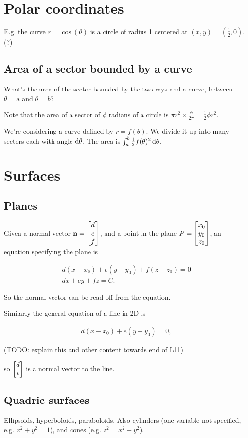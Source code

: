 \documentclass[12pt]{article}
\begin{document}
\section*{Polar coordinates}

E.g. the curve $r = \cos(\theta)$ is a circle of radius 1 centered at $(x, y) = (\frac{1}{2}, 0)$. (?)

\subsection*{Area of a sector bounded by a curve}

What's the area of the sector bounded by the two rays and a curve, between $\theta=a$ and $\theta=b$?

Note that the area of a sector of $\phi$ radians of a circle is $\pi r^2 \times \frac{\phi}{2\pi} = \frac{1}{2}\phi r^2$.

We're considering a curve defined by $r = f(\theta)$. We divide it up into many
sectors each with angle $\operatorname{\text{d}\theta}$. The area is
$\int_a^b \frac{1}{2}f(\theta)^2\operatorname{\text{d}\theta}$.

\section*{Surfaces}

\subsection*{Planes}
Given a normal vector $\mathbf{n} = \begin{bmatrix}d\\e\\f\end{bmatrix}$, and a point in the plane
$P = \begin{bmatrix}x_0\\y_0\\z_0\end{bmatrix}$, an equation specifying the plane is

\begin{align*}
  d(x - x_0) + e(y - y_0) + f(z - z_0) = 0 \\
  dx + ey + fz = C.
\end{align*}

So the normal vector can be read off from the equation.

Similarly the general equation of a line in 2D is

\begin{align*}
  d(x - x_0) + e(y - y_0) = 0,
\end{align*}

(TODO: explain this and other content towards end of L11)

so $\begin{bmatrix}d\\e\end{bmatrix}$ is a normal vector to the line.


\subsection*{Quadric surfaces}
Ellipsoids, hyperboloids, paraboloids. Also cylinders (one variable not
specified, e.g. $x^2 + y^2 = 1$), and cones (e.g. $z^2 = x^2 + y^2$).
\end{document}
